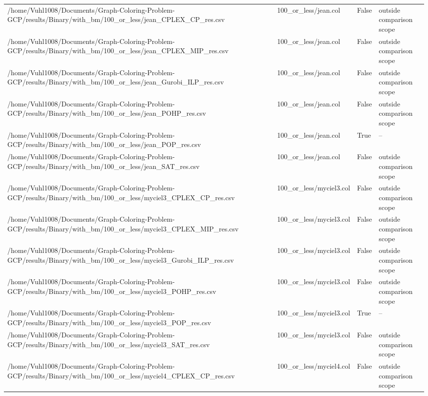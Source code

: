 \begin{table}[htbp]
\begin{tabular}{llll}
/home/Vuhl1008/Documents/Graph-Coloring-Problem-GCP/results/Binary/with\_bm/100\_or\_less/jean\_CPLEX\_CP\_res.csv & 100\_or\_less/jean.col & False & outside comparison scope \\
/home/Vuhl1008/Documents/Graph-Coloring-Problem-GCP/results/Binary/with\_bm/100\_or\_less/jean\_CPLEX\_MIP\_res.csv & 100\_or\_less/jean.col & False & outside comparison scope \\
/home/Vuhl1008/Documents/Graph-Coloring-Problem-GCP/results/Binary/with\_bm/100\_or\_less/jean\_Gurobi\_ILP\_res.csv & 100\_or\_less/jean.col & False & outside comparison scope \\
/home/Vuhl1008/Documents/Graph-Coloring-Problem-GCP/results/Binary/with\_bm/100\_or\_less/jean\_POHP\_res.csv & 100\_or\_less/jean.col & False & outside comparison scope \\
/home/Vuhl1008/Documents/Graph-Coloring-Problem-GCP/results/Binary/with\_bm/100\_or\_less/jean\_POP\_res.csv & 100\_or\_less/jean.col & True & -- \\
/home/Vuhl1008/Documents/Graph-Coloring-Problem-GCP/results/Binary/with\_bm/100\_or\_less/jean\_SAT\_res.csv & 100\_or\_less/jean.col & False & outside comparison scope \\
/home/Vuhl1008/Documents/Graph-Coloring-Problem-GCP/results/Binary/with\_bm/100\_or\_less/myciel3\_CPLEX\_CP\_res.csv & 100\_or\_less/myciel3.col & False & outside comparison scope \\
/home/Vuhl1008/Documents/Graph-Coloring-Problem-GCP/results/Binary/with\_bm/100\_or\_less/myciel3\_CPLEX\_MIP\_res.csv & 100\_or\_less/myciel3.col & False & outside comparison scope \\
/home/Vuhl1008/Documents/Graph-Coloring-Problem-GCP/results/Binary/with\_bm/100\_or\_less/myciel3\_Gurobi\_ILP\_res.csv & 100\_or\_less/myciel3.col & False & outside comparison scope \\
/home/Vuhl1008/Documents/Graph-Coloring-Problem-GCP/results/Binary/with\_bm/100\_or\_less/myciel3\_POHP\_res.csv & 100\_or\_less/myciel3.col & False & outside comparison scope \\
/home/Vuhl1008/Documents/Graph-Coloring-Problem-GCP/results/Binary/with\_bm/100\_or\_less/myciel3\_POP\_res.csv & 100\_or\_less/myciel3.col & True & -- \\
/home/Vuhl1008/Documents/Graph-Coloring-Problem-GCP/results/Binary/with\_bm/100\_or\_less/myciel3\_SAT\_res.csv & 100\_or\_less/myciel3.col & False & outside comparison scope \\
/home/Vuhl1008/Documents/Graph-Coloring-Problem-GCP/results/Binary/with\_bm/100\_or\_less/myciel4\_CPLEX\_CP\_res.csv & 100\_or\_less/myciel4.col & False & outside comparison scope \\

\end{tabular}
\end{table}
